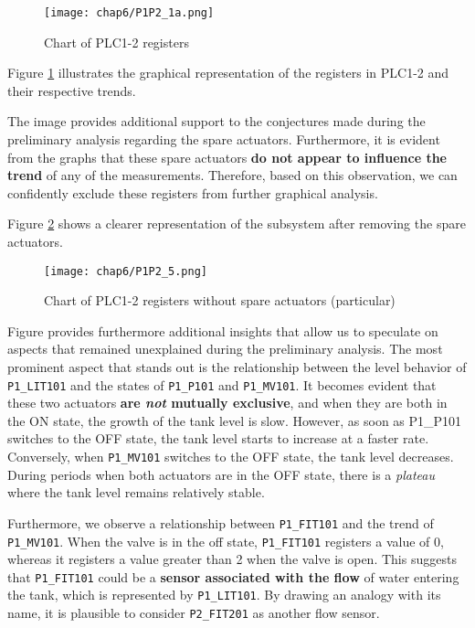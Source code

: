 \begin{figure}[ht]
	\centering
	\texttt{[image: chap6/P1P2\_1a.png]}
	\caption{Chart of PLC1-2 registers}
	\label{fig:6_P1P2_graph_full}
\end{figure}

Figure \ref{fig:6_P1P2_graph_full} illustrates the graphical representation of the registers in PLC1-2 and their respective trends.

The image provides additional support to the conjectures made during the preliminary analysis regarding the spare actuators. Furthermore, it is evident from the graphs that these spare actuators \textbf{do not appear to influence the trend} of any of the measurements. Therefore, based on this observation, we can confidently exclude these registers from further graphical analysis.

\bigskip
Figure \ref{fig:6_P1P2_graph_full_nospare} shows a clearer representation of the subsystem after removing the spare actuators.

\begin{figure}[ht]
	\centering
	\texttt{[image: chap6/P1P2\_5.png]}
	\caption{Chart of PLC1-2 registers without spare actuators (particular)}
	\label{fig:6_P1P2_graph_full_nospare}
\end{figure}

Figure %
provides furthermore additional insights that allow us to speculate on aspects that remained unexplained during the preliminary analysis. The most prominent aspect that stands out is the relationship between the level behavior of \texttt{P1\_LIT101} and the states of \texttt{P1\_P101} and \texttt{P1\_MV101}. It becomes evident that these two actuators \textbf{are \textit{not} mutually exclusive}, and when they are both in the ON state, the growth of the tank level is slow. However, as soon as {P1\_P101} switches to the OFF state, the tank level starts to increase at a faster rate. Conversely, when \texttt{P1\_MV101} switches to the OFF state, the tank level decreases. During periods when both actuators are in the OFF state, there is a \textit{plateau} where the tank level remains relatively stable.

\bigskip
Furthermore, we observe a relationship between \texttt{P1\_FIT101} and the trend of \texttt{P1\_MV101}. When the valve is in the off state, \texttt{P1\_FIT101} registers a value of 0, whereas it registers a value greater than 2 when the valve is open. This suggests that \texttt{P1\_FIT101} could be a \textbf{sensor associated with the flow} of water entering the tank, which is represented by \texttt{P1\_LIT101}. By drawing an analogy with its name, it is plausible to consider \texttt{P2\_FIT201} as another flow sensor.

